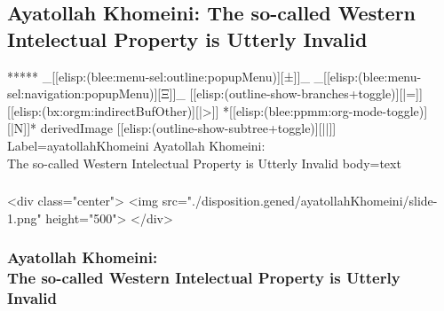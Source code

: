 \begin{whenOrg}
\section{Ayatollah Khomeini: The so-called Western Intelectual Property is Utterly Invalid}


\begin{whenOrg}
*****  _[[elisp:(blee:menu-sel:outline:popupMenu)][±]]_ _[[elisp:(blee:menu-sel:navigation:popupMenu)][Ξ]]_ [[elisp:(outline-show-branches+toggle)][|=]] [[elisp:(bx:orgm:indirectBufOther)][|>]] *[[elisp:(blee:ppmm:org-mode-toggle)][|N]]*  derivedImage [[elisp:(outline-show-subtree+toggle)][||]] Label=ayatollahKhomeini Ayatollah Khomeini:\\ The so-called Western Intelectual Property is Utterly Invalid body=text
\end{whenOrg}

\begin{htmlonly}

\begin{frame}[fragile,plain,label=ayatollahKhomeini]
    \frametitle{}
    \framesubtitle{}
    \begin{rawhtml}
<div class="center">
<img src="./disposition.gened/ayatollahKhomeini/slide-1.png" height="500">
</div>
    \end{rawhtml}
\end{frame}
\end{htmlonly}


\begin{verblatex}


\begin{frame}[fragile,plain,label=ayatollahKhomeini]
    \frametitle{Ayatollah Khomeini:\\ The so-called Western Intelectual Property is Utterly Invalid}
    \framesubtitle{}




\end{frame}
\end{verblatex}
\end{whenOrg}

